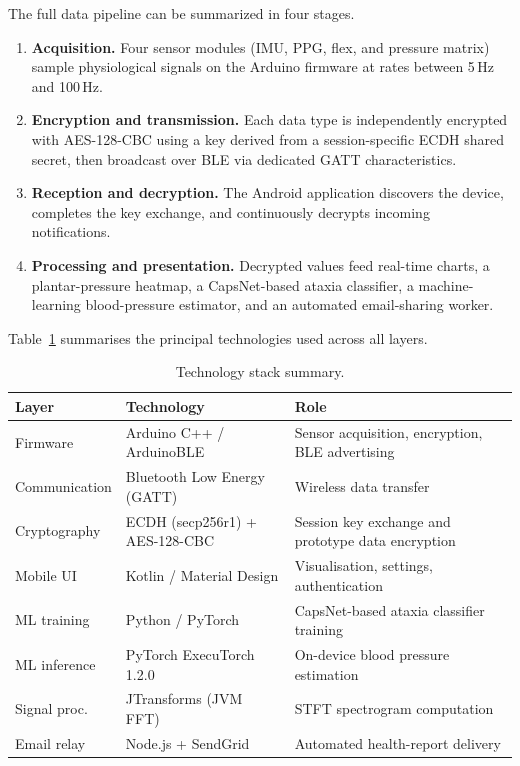 The full data pipeline can be summarized in four stages.

\begin{enumerate}[label=\textbf{Stage~\arabic*.}, leftmargin=*, itemsep=4pt]
  \item \textbf{Acquisition.}  Four sensor modules (IMU, PPG, flex, and pressure matrix) sample
        physiological signals on the Arduino firmware at rates between 5\,Hz and 100\,Hz.
  \item \textbf{Encryption and transmission.}  Each data type is independently encrypted with
        AES-128-CBC using a key derived from a session-specific ECDH shared secret, then
        broadcast over BLE via dedicated GATT characteristics.
  \item \textbf{Reception and decryption.}  The Android application discovers the device,
        completes the key exchange, and continuously decrypts incoming notifications.
  \item \textbf{Processing and presentation.}  Decrypted values feed real-time charts, a
        plantar-pressure heatmap, a CapsNet-based ataxia classifier, a machine-learning
        blood-pressure estimator, and an automated email-sharing worker.
\end{enumerate}

Table~\ref{tab:tech_stack} summarises the principal technologies used across all layers.

\begin{table}[htbp]
  \centering
  \caption{Technology stack summary.}
  \label{tab:tech_stack}
  \begin{tabularx}{\textwidth}{l l X}
    \hline
    \textbf{Layer} & \textbf{Technology} & \textbf{Role} \\
    \hline
    Firmware        & Arduino C++ / ArduinoBLE       & Sensor acquisition, encryption, BLE advertising \\
    Communication  & Bluetooth Low Energy (GATT)    & Wireless data transfer \\
    Cryptography   & ECDH (secp256r1) + AES-128-CBC & Session key exchange and prototype data encryption \\
    Mobile UI      & Kotlin / Material Design       & Visualisation, settings, authentication \\
    ML training    & Python / PyTorch               & CapsNet-based ataxia classifier training \\
    ML inference   & PyTorch ExecuTorch 1.2.0       & On-device blood pressure estimation \\
    Signal proc.   & JTransforms (JVM FFT)          & STFT spectrogram computation \\
    Email relay    & Node.js + SendGrid             & Automated health-report delivery \\
    \hline
  \end{tabularx}
\end{table}


